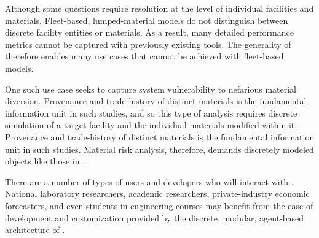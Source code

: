 Although some questions require resolution at the level of 
individual facilities and materials, 
Fleet-based, lumped-material models do not distinguish between discrete
facility entities or materials.  As a result, many detailed performance 
metrics cannot be captured with previously existing tools.
The generality of \Cyclus therefore enables many use cases 
that cannot be achieved with fleet-based models. 

One such use case seeks to capture system vulnerability to nefarious 
material diversion. Provenance and trade-history of distinct materials is the fundamental 
information unit in such studies, and so this type of analysis requires
 discrete simulation of a 
target facility and the individual materials modified within it. 
Provenance and trade-history of distinct materials is the fundamental 
information unit in such studies. 
Material risk analysis, therefore, demands discretely modeled objects like those 
in \Cyclus.

There are a number of types of users and developers who will 
interact with \Cyclus. National laboratory researchers,
academic researchers, private-industry economic forecasters, and even students 
in engineering courses may benefit from the ease of development and
customization provided by the discrete, modular, agent-based architecture of \Cyclus.
